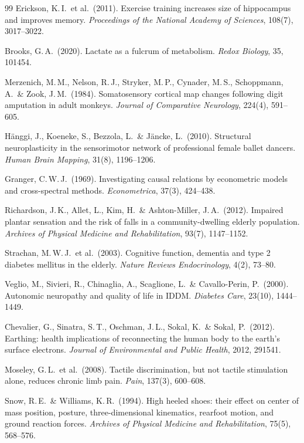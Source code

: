 ﻿\documentclass[12pt,a4paper]{report}
\theoremstyle{plain}
\theoremstyle{definition}
\theoremstyle{remark}
\begin{document}
\begin{thebibliography}{99}
Erickson, K.\,I.\ et al.\ (2011).
Exercise training increases size of hippocampus and improves memory.
\textit{Proceedings of the National Academy of Sciences}, 108(7), 3017--3022.

Brooks, G.\,A.\ (2020).
Lactate as a fulcrum of metabolism.
\textit{Redox Biology}, 35, 101454.

Merzenich, M.\,M., Nelson, R.\,J., Stryker, M.\,P., Cynader, M.\,S.,
Schoppmann, A.\ \& Zook, J.\,M.\ (1984).
Somatosensory cortical map changes following digit amputation in adult monkeys.
\textit{Journal of Comparative Neurology}, 224(4), 591--605.

Hänggi, J., Koeneke, S., Bezzola, L.\ \& Jäncke, L.\ (2010).
Structural neuroplasticity in the sensorimotor network of professional female ballet dancers.
\textit{Human Brain Mapping}, 31(8), 1196--1206.

Granger, C.\,W.\,J.\ (1969).
Investigating causal relations by econometric models and cross-spectral methods.
\textit{Econometrica}, 37(3), 424--438.

Richardson, J.\,K., Allet, L., Kim, H.\ \& Ashton-Miller, J.\,A.\ (2012).
Impaired plantar sensation and the risk of falls in a community-dwelling elderly population.
\textit{Archives of Physical Medicine and Rehabilitation}, 93(7), 1147--1152.

Strachan, M.\,W.\,J.\ et al.\ (2003).
Cognitive function, dementia and type 2 diabetes mellitus in the elderly.
\textit{Nature Reviews Endocrinology}, 4(2), 73--80.

Veglio, M., Sivieri, R., Chinaglia, A., Scaglione, L.\ \& Cavallo-Perin, P.\ (2000).
Autonomic neuropathy and quality of life in IDDM.
\textit{Diabetes Care}, 23(10), 1444--1449.

Chevalier, G., Sinatra, S.\,T., Oschman, J.\,L., Sokal, K.\ \& Sokal, P.\ (2012).
Earthing: health implications of reconnecting the human body to the earth's surface electrons.
\textit{Journal of Environmental and Public Health}, 2012, 291541.

Moseley, G.\,L.\ et al.\ (2008).
Tactile discrimination, but not tactile stimulation alone, reduces chronic limb pain.
\textit{Pain}, 137(3), 600--608.

Snow, R.\,E.\ \& Williams, K.\,R.\ (1994).
High heeled shoes: their effect on center of mass position, posture, three-dimensional kinematics, rearfoot motion, and ground reaction forces.
\textit{Archives of Physical Medicine and Rehabilitation}, 75(5), 568--576.


\end{thebibliography}
\end{document}
